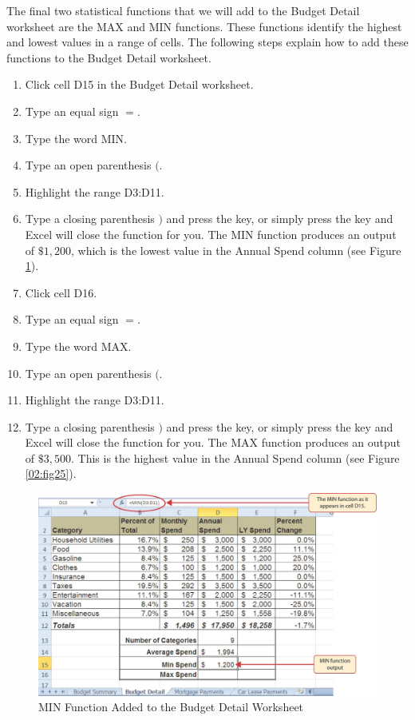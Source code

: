 The final two statistical functions that we will add to the Budget Detail worksheet are the MAX and MIN functions. These functions identify the highest and lowest values in a range of cells. The following steps explain how to add these functions to the Budget Detail worksheet.

\begin{enumerate}
	\item Click cell \textsf{D15} in the Budget Detail worksheet.
	\item Type an equal sign $ = $.
	\item Type the word MIN.
	\item Type an open parenthesis $ ( $.
	\item Highlight the range \textsf{D3:D11}.
	\item Type a closing parenthesis $ ) $ and press the  key, or simply press the  key and Excel will close the function for you. The MIN function produces an output of $ \$1,200 $, which is the lowest value in the Annual Spend column (see Figure \ref{02:fig24}).
	\item Click cell \textsf{D16}.
	\item Type an equal sign $ = $.
	\item Type the word MAX.
	\item Type an open parenthesis $ ( $.
	\item Highlight the range \textsf{D3:D11}.
	\item Type a closing parenthesis $ ) $ and press the  key, or simply press the  key and Excel will close the function for you. The MAX function produces an output of $ \$3,500 $. This is the highest value in the Annual Spend column (see Figure \ref{02:fig25}).
\end{enumerate}

\begin{figure}[H]
	\centering
	\includegraphics[width=\maxwidth{.95\linewidth}]{gfx/ch02_fig24}
	\caption{MIN Function Added to the Budget Detail Worksheet}
	\label{02:fig24}
\end{figure}


